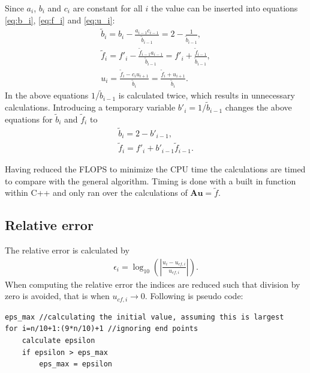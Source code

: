 \documentclass{emulateapj}
\begin{document}
Since $a_i$, $b_i$ and $c_i$ are constant for all $i$ the value can be inserted into equations \eqref{eq:b_i}, \eqref{eq:f_i} and \eqref{eq:u_i}:
%
\begin{gather*}
    \tilde{b}_i = b_i - \frac{a_{i-1}c_{i-1}}{\tilde{b}_{i-1}} = 2 - \frac{1}{\tilde{b}_{i-1}}, \\
    \tilde{f}_i = f'_i - \frac{\tilde{f}_{i-1} a_{i-1} }{\tilde{b}_{i-1}} = f'_i + \frac{\tilde{f}_{i-1}}{\tilde{b}_{i-1}}, \\
    u_i = \frac{\tilde{f}_i - c_i u_{i+1}}{\tilde{b}_i} = \frac{\tilde{f}_i + u_{i+1}}{\tilde{b}_i}.
\end{gather*}
%
In the above equations $1/\tilde{b}_{i-1}$ is calculated twice, which results in unnecessary calculations. Introducing a temporary variable $b'_i = 1/\tilde{b}_{i-1}$ changes the above equations for $\tilde{b}_i$ and $\tilde{f}_i$ to
%
\begin{gather*}
    \tilde{b}_i = 2 - b'_{i-1}, \\
    \tilde{f}_i = f'_i + b'_{i-1}\tilde{f}_{i-1}.
\end{gather*}
%

Having reduced the FLOPS to minimize the CPU time the calculations are timed to compare with the general algorithm. Timing is done with a built in function within C++ and only ran over the calculations of $\boldsymbol{A}\boldsymbol{u} = \tilde{f}$.

\subsection{Relative error}
The relative error is calculated by
%
\begin{gather}
    \epsilon_i = \log_{10}\left(\left|\frac{u_i - u_{cf,i}}{u_{cf,i}}\right|\right).
\end{gather}
%
When computing the relative error the indices are reduced such that division by zero is avoided, that is when $u_{cf,i} \rightarrow 0$. Following is pseudo code:
\begin{lstlisting}
eps_max //calculating the initial value, assuming this is largest
for i=n/10+1:(9*n/10)+1 //ignoring end points
    calculate epsilon
    if epsilon > eps_max
        eps_max = epsilon
\end{lstlisting}

%
\end{document}
